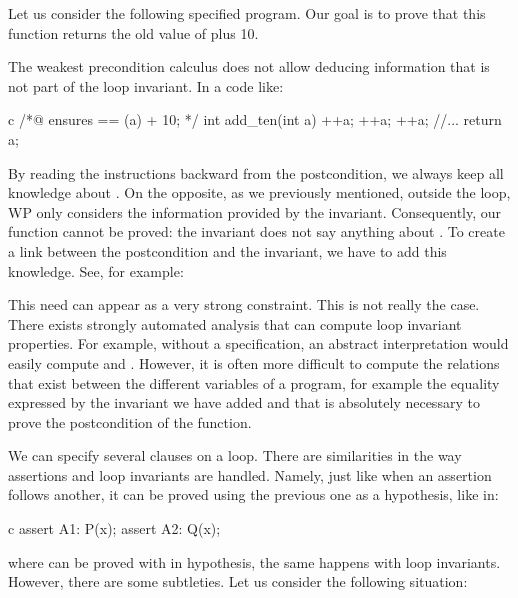 

Let us consider the following specified program. Our goal is to prove
that this function returns the old value of  plus 10.






The weakest precondition calculus does not allow deducing information
that is not part of the loop invariant. In a code like:



\begin{CodeBlock}{c}
/*@
    ensures \result == \old(a) + 10;
*/
int add_ten(int a){
    ++a;
    ++a;
    ++a;
    //...
    return a;
}
\end{CodeBlock}


By reading the instructions backward
from the postcondition, we always keep all knowledge about . On
the opposite, as we previously mentioned, outside the loop, WP only
considers the information provided by the invariant. Consequently, our
 function cannot be proved: the invariant does not say anything
about . To create a link between the postcondition and the
invariant, we have to add this knowledge. See, for example:






\begin{Information}
  This need can appear as a very strong constraint. This is not really the
  case. There exists strongly automated analysis that can compute loop
  invariant properties. For example, without a specification, an abstract
  interpretation would easily compute 
  and .
  However, it is often more difficult to compute the relations
  that exist between the different variables of a program, for
  example the equality expressed by the invariant we have
  added and that is absolutely necessary to prove the postcondition of the
  function.
\end{Information}


\label{l3:statements-loops-multi-inv}

We can specify several  clauses on a loop. There are
similarities in the way assertions and loop invariants are handled. Namely, just
like when an assertion follows another, it can be proved using the previous one
as a hypothesis, like in:
\begin{CodeBlock}{c}
assert A1: P(x);
assert A2: Q(x);
\end{CodeBlock}
where  can be proved with  in hypothesis, the same
happens with loop invariants. However, there are some subtleties. Let us
consider the following situation:


